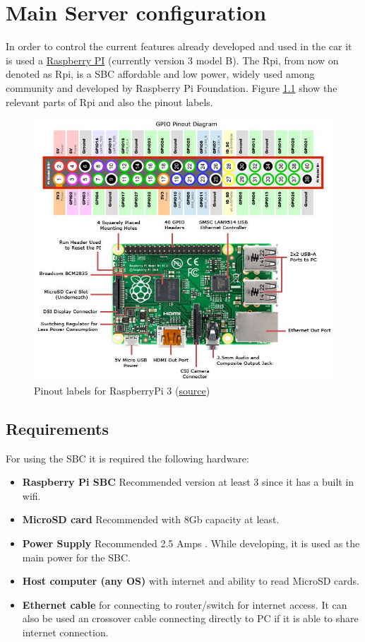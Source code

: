 \chapter{Main Server configuration}
\label{chapter:server}

In order to control the current features already developed and used in the car it is used a \href{https://www.raspberrypi.org/products/}{Raspberry PI} (currently version 3 model B). The \acrlong{Rpi}, from now on denoted as \acrshort{Rpi}, is a \gls{SBC} affordable and low power, widely used among community and developed by Raspberry Pi Foundation. Figure \ref{fig:raspberrypi_pinout} show the relevant parts of \gls{Rpi} and also the pinout labels.

\begin{figure}[!h]
	\centering
	\includegraphics[width=0.9\linewidth]{figures/raspberry_pi_circuit_note_fig2}
	\caption[Pinout labels for RaspberryPi 3]{Pinout labels for RaspberryPi 3 (\href{https://www.jameco.com/Jameco/workshop/circuitnotes/raspberry-pi-circuit-note.html}{source})}
	\label{fig:raspberrypi_pinout}
\end{figure}

\section{Requirements}
For using the \gls{SBC} it is required the following hardware:
\begin{itemize}
	\tightlist
	\item \textbf{Raspberry Pi \gls{SBC}} Recommended version at least 3 since it has a built in wifi.
	\item \textbf{MicroSD card} Recommended with 8Gb capacity at least.
	\item \textbf{Power Supply} Recommended 2.5 Amps . While developing, it is used as the main power for the \gls{SBC}.
	\item \textbf{Host computer (any \gls{OS})} with internet and ability to read MicroSD cards.
	\item \textbf{Ethernet cable} for connecting to router/switch for internet access. It can also be used an crossover cable connecting directly to PC if it is able to share internet connection.
\end{itemize}

